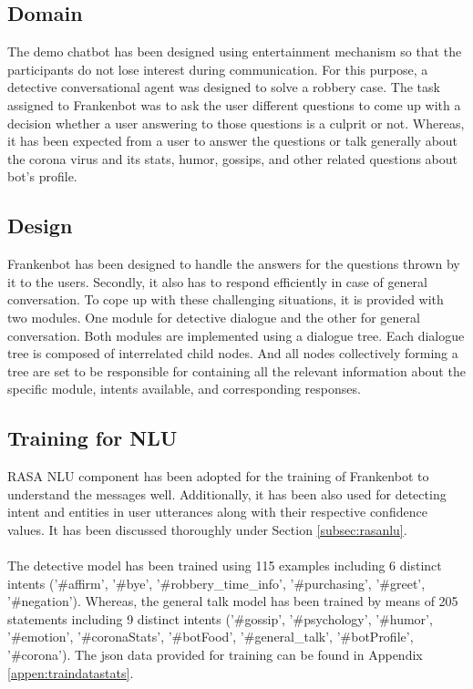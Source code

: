 \subsection{Domain}
The demo chatbot has been designed using entertainment mechanism so that the participants do not lose interest during communication. For this purpose, a detective conversational agent was designed to solve a robbery case. The task assigned to Frankenbot was to ask the user different questions to come up with a decision whether a user answering to those questions is a culprit or not. Whereas, it has been expected from a user to answer the questions or talk generally about the corona virus and its stats, humor, gossips, and other related questions about bot's profile.

\subsection{Design}
Frankenbot has been designed to handle the answers for the questions thrown by it to the users. Secondly, it also has to respond efficiently in case of general conversation. To cope up with these challenging situations, it is provided with two modules. One module for detective dialogue and the other for general conversation. Both modules are implemented using a dialogue tree. Each dialogue tree is composed of interrelated child nodes. And all nodes collectively forming a tree are set to be responsible for containing all the relevant information about the specific module, intents available, and corresponding responses. 

\subsection{Training for NLU \label{sec:expchatbot}}
RASA NLU component has been adopted for the training of Frankenbot to understand the messages well. Additionally, it has been also used for detecting intent and entities in user utterances along with their respective confidence values.  It has been discussed thoroughly under Section \ref{subsec:rasanlu}.  
\\~\\
The detective model has been trained using 115 examples including 6 distinct intents ('\#affirm', '\#bye', '\#robbery\_time\_info', '\#purchasing', '\#greet', '\#negation'). Whereas, the general talk model has been trained by means of 205 statements including 9 distinct intents ('\#gossip', '\#psychology', '\#humor', '\#emotion', '\#coronaStats', '\#botFood', '\#general\_talk', '\#botProfile', '\#corona'). The json data provided for training can be found in Appendix \ref{appen:traindatastats}.

